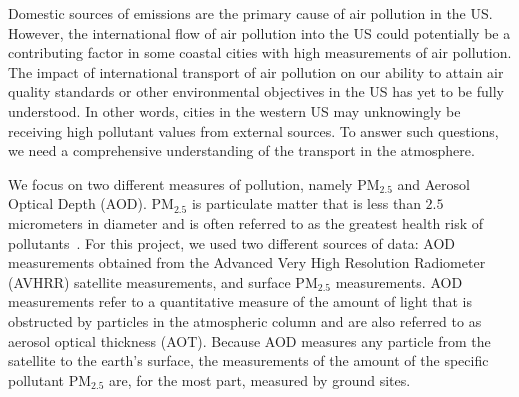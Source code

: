 \documentclass[10pt]{article}
\begin{document}
Domestic sources of emissions are the primary cause of air pollution in the
US. However, the international flow of air pollution into
the US could potentially be a contributing factor in some coastal cities with 
high measurements of air pollution. The impact of international transport of
air pollution on our ability to attain air quality standards or other
environmental objectives in the US has yet to be fully understood. In
other words, cities in the western US may unknowingly be receiving high
pollutant values from external sources. {To answer such questions, 
we need a comprehensive understanding of the transport in the
atmosphere.  }



{We focus on two different measures of pollution, namely PM$_{2.5}$ and Aerosol
Optical Depth (AOD).} PM$_{2.5}$ is particulate matter that is less than $2.5$
micrometers in diameter and is often referred to as the greatest health risk of
pollutants~\cite{epa}. For this project, we used two different sources of data: 
{AOD} measurements obtained from the Advanced Very High Resolution
Radiometer (AVHRR) satellite measurements, and surface PM$_{2.5}$ measurements.
AOD measurements refer to a quantitative measure of the amount of light that is
obstructed by particles in the atmospheric column and are also referred to as
aerosol optical thickness (AOT). Because AOD measures any particle from the
satellite to the earth's surface, the measurements of the amount of the
specific pollutant PM$_{2.5}$ are, for the most part, measured by ground sites.
\end{document}

